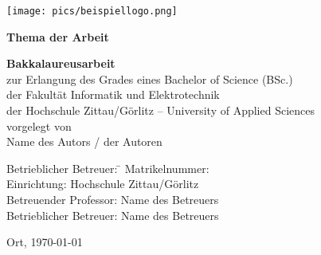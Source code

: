  \begin{titlepage}

\begin{center}
	\texttt{[image: pics/beispiellogo.png]}%
\end{center}
	\vspace{2cm}
      \enlargethispage{3cm}
      \begin{center}
          {\LARGE \textbf{Thema der Arbeit}}
          \vspace{3cm}
          \begin{flushleft}
              {\large \textbf{Bakkalaureusarbeit}}\\[1cm]
              zur Erlangung des Grades eines Bachelor of Science (BSc.)\\
              der Fakult\"{a}t Informatik und Elektrotechnik \\
              der Hochschule Zittau/G\"{o}rlitz -- University of Applied Sciences\\[3cm]

          vorgelegt von \\[1cm]
          {\large Name des Autors / der Autoren} \\
	

          {    \begin{tabbing}

	    
                Betrieblicher Betreuer: \= \kill
		 Matrikelnummer:  \\
				Einrichtung: \> Hochschule Zittau/Görlitz \\
                Betreuender Professor: \> Name des Betreuers\\
                Betrieblicher Betreuer: \> Name des Betreuers\\
            \end{tabbing}}
          \vfill
              Ort, \today
          \end{flushleft}


      \end{center}
      \setcounter{page}{-1}
  \end{titlepage}